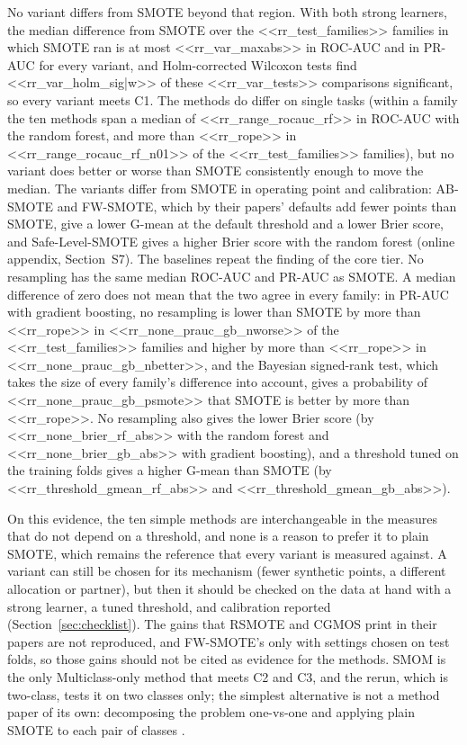 No variant differs from SMOTE beyond that region. With both strong learners, the median difference from SMOTE over the <<rr_test_families>> families in which SMOTE ran is at most <<rr_var_maxabs>> in ROC-AUC and in PR-AUC for every variant, and Holm-corrected Wilcoxon tests find <<rr_var_holm_sig|w>> of these <<rr_var_tests>> comparisons significant, so every variant meets C1. The methods do differ on single tasks (within a family the ten methods span a median of <<rr_range_rocauc_rf>> in ROC-AUC with the random forest, and more than <<rr_rope>> in <<rr_range_rocauc_rf_n01>> of the <<rr_test_families>> families), but no variant does better or worse than SMOTE consistently enough to move the median. The variants differ from SMOTE in operating point and calibration: AB-SMOTE and FW-SMOTE, which by their papers' defaults add fewer points than SMOTE, give a lower G-mean at the default threshold and a lower Brier score, and Safe-Level-SMOTE gives a higher Brier score with the random forest (online appendix, Section~S7). The baselines repeat the finding of the core tier. No resampling has the same median ROC-AUC and PR-AUC as SMOTE. A median difference of zero does not mean that the two agree in every family: in PR-AUC with gradient boosting, no resampling is lower than SMOTE by more than <<rr_rope>> in <<rr_none_prauc_gb_nworse>> of the <<rr_test_families>> families and higher by more than <<rr_rope>> in <<rr_none_prauc_gb_nbetter>>, and the Bayesian signed-rank test, which takes the size of every family's difference into account, gives a probability of <<rr_none_prauc_gb_psmote>> that SMOTE is better by more than <<rr_rope>>. No resampling also gives the lower Brier score (by <<rr_none_brier_rf_abs>> with the random forest and <<rr_none_brier_gb_abs>> with gradient boosting), and a threshold tuned on the training folds gives a higher G-mean than SMOTE (by <<rr_threshold_gmean_rf_abs>> and <<rr_threshold_gmean_gb_abs>>).

On this evidence, the ten simple methods are interchangeable in the measures that do not depend on a threshold, and none is a reason to prefer it to plain SMOTE, which remains the reference that every variant is measured against. A variant can still be chosen for its mechanism (fewer synthetic points, a different allocation or partner), but then it should be checked on the data at hand with a strong learner, a tuned threshold, and calibration reported (Section~\ref{sec:checklist}). The gains that RSMOTE and CGMOS print in their papers are not reproduced, and FW-SMOTE's only with settings chosen on test folds, so those gains should not be cited as evidence for the methods. SMOM is the only Multiclass-only method that meets C2 and C3, and the rerun, which is two-class, tests it on two classes only; the simplest alternative is not a method paper of its own: decomposing the problem one-vs-one and applying plain SMOTE to each pair of classes \citep{fernandez2013analysing}.
